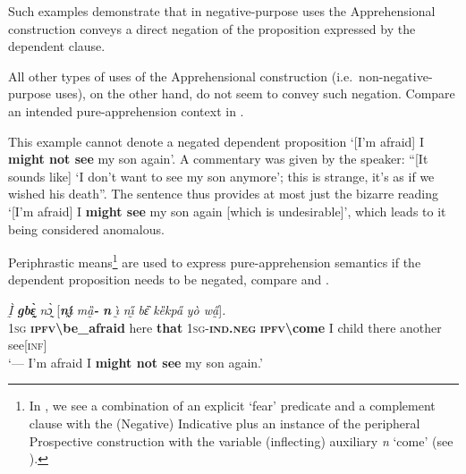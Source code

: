 \documentclass[output=paper,colorlinks,citecolor=brown]{langscibook}
\begin{document}
Such examples demonstrate that in negative-purpose uses the Apprehensional construction conveys a direct negation of the proposition expressed by the dependent clause.

All other types of uses of the Apprehensional construction (i.e.\ non-negative-purpose uses), on the other hand, do not seem to convey such negation. Compare an intended pure-apprehension context in .


\z

\noindent This example cannot denote a negated dependent proposition `[I'm afraid] I \textbf{might not see} my son again'. A commentary was given by the speaker: ``[It sounds like] `I don't want to see my son anymore'; this is strange, it's as if we wished his death''. The sentence thus provides at most just the bizarre reading `[I'm afraid] I \textbf{might see} my son again [which is undesirable]', which leads to it being considered anomalous.

Periphrastic means\footnote{In , we see a combination of an explicit `fear' predicate and a complement clause with the (Negative) Indicative plus an instance of the peripheral Prospective construction with the variable (inflecting) auxiliary \textit{n{\ù}} `come' (see ).} are used to express pure-apprehension semantics if the dependent proposition needs to be negated, compare  and .

\ea \label{ex:Fed71prime}
\gll \textit{Ḭ̀} \textit{\textbf{gbɛ̰̀}} \textit{nɔ̰̀} \textup{[}\textit{\textbf{nı̰́}} \textit{mȁ̰\textbf{-{\à}}} \textit{\textbf{n{\ù}}} \textit{ı̰̀} \textit{nı̰̋} \textit{bɛ̏} \textit{kȅkpa̋} \textit{yò wa̰̋}\textup{]}\textit{.}\\
\textsc{1sg} \textsc{\textbf{ipfv\backslash}}\textbf{be\_afraid} here \textbf{that} \textsc{1sg-\textbf{ind.neg}} \textbf{\textsc{ipfv\backslash}come} I child there another see[\textsc{inf}] \\
 `--- I'm afraid I \textbf{might not see} my son again.'
\z
\end{document}
